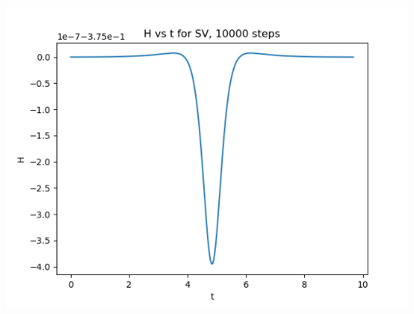 \documentclass{article}
\begin{document}
\begin{enumerate}
\begin{enumerate}[label=(\alph*)]
\begin{center}
		\includegraphics[scale=.3]{hw5 SV ham 10000 steps}
	\end{center}
	
\end{enumerate}

\end{enumerate}
\end{document}

